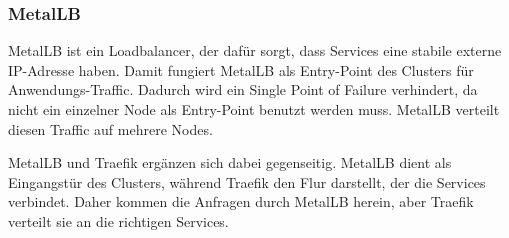 \subsubsection{MetalLB}
MetalLB ist ein Loadbalancer, der dafür sorgt, dass Services eine stabile externe IP-Adresse haben.
Damit fungiert MetalLB als Entry-Point des Clusters für Anwendungs-Traffic.
Dadurch wird ein Single Point of Failure verhindert, da nicht ein einzelner Node als Entry-Point benutzt werden muss.
MetalLB verteilt diesen Traffic auf mehrere Nodes.

MetalLB und Traefik ergänzen sich dabei gegenseitig. 
MetalLB dient als Eingangstür des Clusters, während Traefik den Flur darstellt, der die Services verbindet.
Daher kommen die Anfragen durch MetalLB herein, aber Traefik verteilt sie an die richtigen Services.